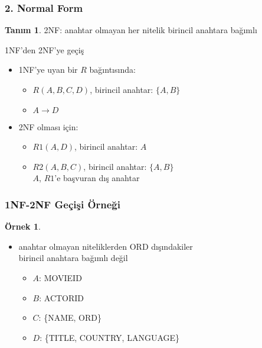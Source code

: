 \documentclass[dvipsnames]{beamer}
\theoremstyle{definition}
\newtheorem{tanim}[theorem]{Tanım}
\theoremstyle{example}
\newtheorem{ornek}[theorem]{Örnek}
\theoremstyle{plain}
\begin{document}
\begin{frame}
  \frametitle{2. Normal Form}

  \begin{tanim}
    \alert{2NF}: anahtar olmayan her nitelik birincil anahtara bağımlı
  \end{tanim}

  \begin{block}{1NF'den 2NF'ye geçiş}
    \begin{itemize}
      \item 1NF'ye uyan bir $R$ bağıntısında:
      \begin{itemize}
        \item $R(A,B,C,D)$, birincil anahtar: $\{A,B\}$
        \item $A \rightarrow D$
      \end{itemize}

      \pause
      \item 2NF olması için:
      \begin{itemize}
        \item $R1(A,D)$, birincil anahtar: $A$
        \item $R2(A,B,C)$, birincil anahtar: $\{A,B\}$\\
          $A$, $R1$'e başvuran dış anahtar
      \end{itemize}
    \end{itemize}
  \end{block}
\end{frame}

\begin{frame}
  \frametitle{1NF-2NF Geçişi Örneği}

  \begin{ornek}
    \begin{itemize}
      \item anahtar olmayan niteliklerden ORD dışındakiler\\
	birincil anahtara bağımlı değil

      \pause
      \begin{itemize}
        \item $A$: MOVIEID
        \item $B$: ACTORID
        \item $C$: \{NAME, ORD\}
        \item $D$: \{TITLE, COUNTRY, LANGUAGE\}
      \end{itemize}
    \end{itemize}
  \end{ornek}
\end{frame}
\end{document}
